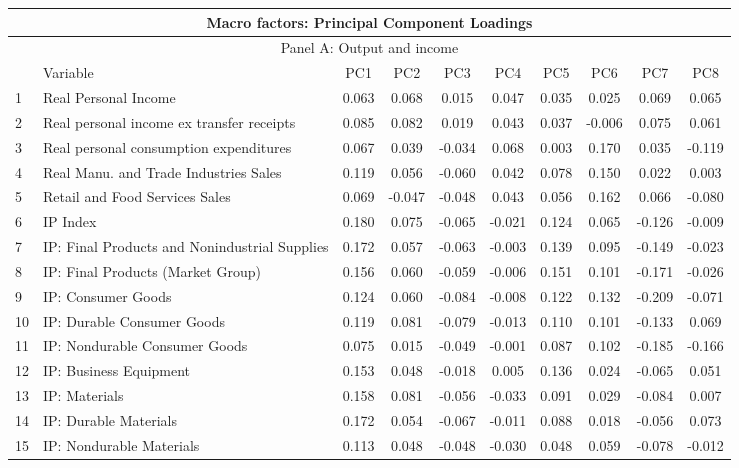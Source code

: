 \setlength{\tabcolsep}{3.8pt}
\begin{table}[!h]
\scriptsize
    \centering
    \begin{tabular}{llcccccccc}
    \hline
\multicolumn{10}{c}{Macro factors: Principal Component Loadings} \\ \hline
 \multicolumn{10}{c}{Panel A: Output and income} \\ 
&Variable&	PC1	&	PC2	&	PC3	&	PC4	&	PC5	&	PC6	&	PC7	&	PC8	\\ \hline
1&Real Personal Income	&	0.063	&	0.068	&	0.015	&	0.047	&	0.035	&	0.025	&	0.069	&	0.065	\\
2&Real personal income ex transfer receipts	&	0.085	&	0.082	&	0.019	&	0.043	&	0.037	&	-0.006	&	0.075	&	0.061	\\
3&Real personal consumption expenditures	&	0.067	&	0.039	&	-0.034	&	0.068	&	0.003	&	0.170	&	0.035	&	-0.119	\\
4&Real Manu. and Trade Industries Sales	&	0.119	&	0.056	&	-0.060	&	0.042	&	0.078	&	0.150	&	0.022	&	0.003	\\
5&Retail and Food Services Sales	&	0.069	&	-0.047	&	-0.048	&	0.043	&	0.056	&	0.162	&	0.066	&	-0.080	\\
6&IP Index	&	0.180	&	0.075	&	-0.065	&	-0.021	&	0.124	&	0.065	&	-0.126	&	-0.009	\\
7&IP: Final Products and Nonindustrial Supplies	&	0.172	&	0.057	&	-0.063	&	-0.003	&	0.139	&	0.095	&	-0.149	&	-0.023	\\
8&IP: Final Products (Market Group)	&	0.156	&	0.060	&	-0.059	&	-0.006	&	0.151	&	0.101	&	-0.171	&	-0.026	\\
9&IP: Consumer Goods	&	0.124	&	0.060	&	-0.084	&	-0.008	&	0.122	&	0.132	&	-0.209	&	-0.071	\\
10&IP: Durable Consumer Goods	&	0.119	&	0.081	&	-0.079	&	-0.013	&	0.110	&	0.101	&	-0.133	&	0.069	\\
11&IP: Nondurable Consumer Goods	&	0.075	&	0.015	&	-0.049	&	-0.001	&	0.087	&	0.102	&	-0.185	&	-0.166	\\
12&IP: Business Equipment	&	0.153	&	0.048	&	-0.018	&	0.005	&	0.136	&	0.024	&	-0.065	&	0.051	\\
13&IP: Materials	&	0.158	&	0.081	&	-0.056	&	-0.033	&	0.091	&	0.029	&	-0.084	&	0.007	\\
14&IP: Durable Materials	&	0.172	&	0.054	&	-0.067	&	-0.011	&	0.088	&	0.018	&	-0.056	&	0.073	\\
15&IP: Nondurable Materials	&	0.113	&	0.048	&	-0.048	&	-0.030	&	0.048	&	0.059	&	-0.078	&	-0.012	\\

\end{tabular}
\end{table}

